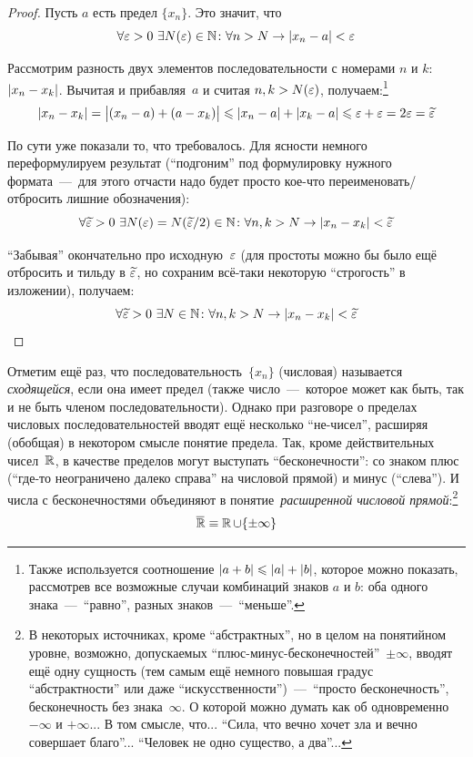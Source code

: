 \documentclass[a4paper,12pt]{article}
\newcommand{\widebar}[1]{\overline{#1\mkern-1.5mu}\mkern 1.5mu}  %
\begin{document}
  \begin{proof}
    Пусть $a$ есть предел $\{x_n\}$.
    Это значит, что
    \[
      \forall \eps > 0\ \exists N(\eps) \in \NN\colon \forall n > N \to |x_n - a| < \eps
    \]
    
    Рассмотрим разность двух элементов последовательности с номерами $n$ и $k$: $|x_n \hm- x_k|$.
    Вычитая и прибавляя~$a$ и считая $n, k \hm> N(\eps)$, получаем:\footnote{
      Также используется соотношение $|a \hm+ b| \hm\leq |a| \hm+ |b|$, которое можно показать, рассмотрев все возможные случаи комбинаций знаков $a$ и $b$: оба одного знака~---~``равно'', разных знаков~---~``меньше''.
    }
    \[
      |x_n - x_k| = \bigl|(x_n - a) + (a - x_k)\bigr| \leqslant |x_n - a| + |x_k - a| \leqslant \varepsilon + \varepsilon = 2 \varepsilon = \widetilde {\varepsilon}
    \]
    
    По сути уже показали то, что требовалось.
    Для ясности немного переформулируем результат (``подгоним'' под формулировку нужного формата~---~для этого отчасти надо будет просто кое-что переименовать/отбросить лишние обозначения):
    \[
      \forall \widetilde {\varepsilon} > 0\ \exists N(\varepsilon) = N(\widetilde {\varepsilon} / 2) \in \mathbb N\colon \forall n, k > N \to |x_n - x_k| < \widetilde {\varepsilon}
    \]
    
    ``Забывая'' окончательно про исходную~$\varepsilon$ (для простоты можно бы было ещё отбросить и тильду в $\widetilde {\varepsilon}$, но сохраним всё-таки некоторую ``строгость'' в изложении), получаем:
    \[
      \forall \widetilde {\varepsilon} > 0\ \exists N \in \mathbb N\colon \forall n, k > N \to |x_n - x_k| < \widetilde {\varepsilon}
    \]
  \end{proof}

  Отметим ещё раз, что последовательность~$\{x_n\}$ (числовая) называется \emph{сходящейся}, если она имеет предел (также число~---~которое может как быть, так и не быть членом последовательности).
  Однако при разговоре о пределах числовых последовательностей вводят ещё несколько ``не-чисел'', расширяя (обобщая) в некотором смысле понятие предела.
  Так, кроме действительных чисел~$\operatorname{\mathbb R}$, в качестве пределов могут выступать ``бесконечности'': со знаком плюс (``где-то неограничено далеко справа'' на числовой прямой) и минус (``слева'').
  И числа с бесконечностями объединяют в понятие~\emph{расширенной числовой прямой}:\footnote{
     В некоторых источниках, кроме ``абстрактных'', но в целом на понятийном уровне, возможно, допускаемых ``плюс-минус-бесконечностей''~$\pm \infty$, вводят ещё одну сущность (тем самым ещё немного повышая градус ``абстрактности'' или даже ``искусственности'')~---~``просто бесконечность'', бесконечность без знака~$\infty$.
     О которой можно думать как об одновременно ${-}\infty$ и ${+}\infty$...
     В том смысле, что...
     ``Сила, что вечно хочет зла и вечно совершает благо''...
     ``Человек не одно существо, а два''...
  }
  \[
    \widebar{\RR} \equiv \RR \cup \{\pm \infty\}
  \]
\end{document}
